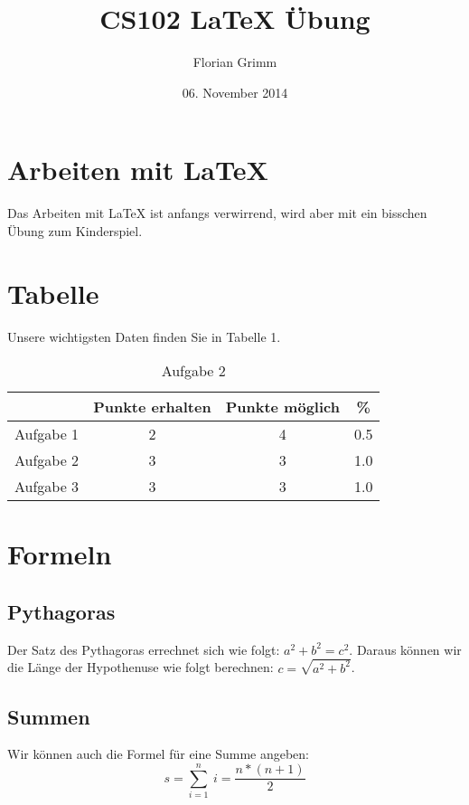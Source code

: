 \documentclass[10pt,a4paper]{article}
\author{Florian Grimm}
\title{CS102 \LaTeX \hspace{1pt} Übung}
\date{06. November 2014}
\begin{document}
\maketitle

\section{Arbeiten mit \LaTeX}

Das Arbeiten mit LaTeX  ist anfangs verwirrend, wird aber mit ein bisschen Übung zum Kinderspiel.

\section{Tabelle}

Unsere wichtigsten Daten finden Sie in Tabelle 1.

\begin{table}[htpb]
\centering
\begin{tabular}{l|c|c|c}
\newline & Punkte erhalten & Punkte möglich & \% \\
\hline Aufgabe 1 & 2 & 4 & 0.5  \\
\hline Aufgabe 2 & 3 & 3 & 1.0  \\
\hline Aufgabe 3 & 3 & 3 & 1.0
 
\end{tabular}
\caption{Aufgabe 2}
\end{table}
\section{Formeln}
\subsection{Pythagoras}

Der Satz des Pythagoras errechnet sich wie folgt:
$a^2+b^2=c^2$. Daraus können wir die Länge der Hypothenuse wie folgt berechnen:
$c=\sqrt{a^2+b^2}$.
\subsection{Summen}
Wir können auch die Formel für eine Summe angeben:
\begin{equation}
s=\sum_{i=1}^n \ i=\frac{n*(n+1)}{2}
\end{equation}
\end{document}
